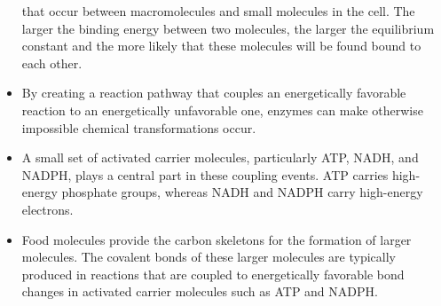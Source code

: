 \begin{itemize}
that occur between macromolecules and small molecules in
the cell. The larger the binding energy between two molecules, the
larger the equilibrium constant and the more likely that these molecules 
will be found bound to each other.
\item By creating a reaction pathway that couples an energetically favorable 
reaction to an energetically unfavorable one, enzymes can make
otherwise impossible chemical transformations occur.
\item A small set of activated carrier molecules, particularly ATP, NADH,
and NADPH, plays a central part in these coupling events. ATP carries 
high-energy phosphate groups, whereas NADH and NADPH carry
high-energy electrons.
\item Food molecules provide the carbon skeletons for the formation of
larger molecules. The covalent bonds of these larger molecules are
typically produced in reactions that are coupled to energetically favorable 
bond changes in activated carrier molecules such as ATP and NADPH.
\end{itemize}